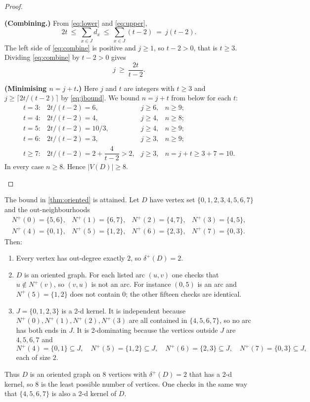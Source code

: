 \documentclass[11pt]{article}
\numberwithin{equation}{section}
\theoremstyle{plain}
\newcommand{\V}{V}
\newcommand{\Np}{N^{+}}
\newcommand{\dmin}{\delta^{+}}
\begin{document}
\begin{proof}
\begin{steps}
\item\textbf{(Combining.)}
From \eqref{eq:lower} and \eqref{eq:upper},
\begin{equation}\label{eq:combine}
  2t\ \le\ \sum_{x\in J}d_x\ \le\ \sum_{x\in J}(t-2)\ =\ j(t-2).
\end{equation}
The left side of \eqref{eq:combine} is positive and $j\ge 1$, so $t-2>0$, that is
$t\ge 3$. Dividing \eqref{eq:combine} by $t-2>0$ gives
\begin{equation}\label{eq:jbound}
  j\ \ge\ \frac{2t}{t-2}.
\end{equation}

\item\textbf{(Minimising $n=j+t$.)}
Here $j$ and $t$ are integers with $t\ge 3$ and $j\ge\lceil 2t/(t-2)\rceil$ by
\eqref{eq:jbound}. We bound $n=j+t$ from below for each $t$:
\[
\begin{array}{llll}
t=3: & 2t/(t-2)=6, & j\ge 6, & n\ge 9;\\[2pt]
t=4: & 2t/(t-2)=4, & j\ge 4, & n\ge 8;\\[2pt]
t=5: & 2t/(t-2)=10/3, & j\ge 4, & n\ge 9;\\[2pt]
t=6: & 2t/(t-2)=3, & j\ge 3, & n\ge 9;\\[2pt]
t\ge 7: & 2t/(t-2)=2+\dfrac{4}{t-2}>2, & j\ge 3, & n=j+t\ge 3+7=10.
\end{array}
\]
In every case $n\ge 8$. Hence $|\V(D)|\ge 8$.
\end{steps}
\end{proof}

\begin{example}\label{ex:oriented8}
The bound in \cref{thm:oriented} is attained. Let $D$ have vertex set
$\{0,1,2,3,4,5,6,7\}$ and the out-neighbourhoods
\[
\begin{array}{llll}
\Np(0)=\{5,6\}, & \Np(1)=\{6,7\}, & \Np(2)=\{4,7\}, & \Np(3)=\{4,5\},\\[2pt]
\Np(4)=\{0,1\}, & \Np(5)=\{1,2\}, & \Np(6)=\{2,3\}, & \Np(7)=\{0,3\}.
\end{array}
\]
Then:
\begin{enumerate}[label=\textup{(\roman*)},leftmargin=2.4em]
\item Every vertex has out-degree exactly $2$, so $\dmin(D)=2$.
\item $D$ is an oriented graph. For each listed arc $(u,v)$ one checks that $u\notin
\Np(v)$, so $(v,u)$ is not an arc. For instance $(0,5)$ is an arc and $\Np(5)=\{1,2\}$
does not contain $0$; the other fifteen checks are identical.
\item $J=\{0,1,2,3\}$ is a 2-d kernel. It is independent because $\Np(0),\Np(1),\Np(2),
\Np(3)$ are all contained in $\{4,5,6,7\}$, so no arc has both ends in $J$. It is
2-dominating because the vertices outside $J$ are $4,5,6,7$ and
\[
  \Np(4)=\{0,1\}\subseteq J,\quad \Np(5)=\{1,2\}\subseteq J,\quad
  \Np(6)=\{2,3\}\subseteq J,\quad \Np(7)=\{0,3\}\subseteq J,
\]
each of size $2$.
\end{enumerate}
Thus $D$ is an oriented graph on $8$ vertices with $\dmin(D)=2$ that has a 2-d kernel, so
$8$ is the least possible number of vertices. One checks in the same way that
$\{4,5,6,7\}$ is also a 2-d kernel of $D$.
\end{example}
\end{document}
